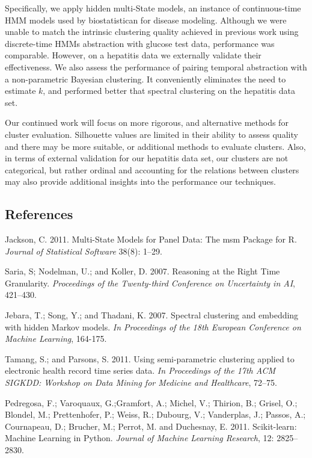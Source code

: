 \documentclass[letterpaper]{article}
\begin{document}
Specifically, we apply hidden multi-State models, an instance of continuous-time HMM models used by biostatistican for disease modeling.  Although we were unable to match the intrinsic clustering quality achieved in previous work using discrete-time HMMs abstraction with glucose test data, performance was comparable.  However, on a hepatitis data we externally validate their effectiveness.  We also assess the performance of pairing temporal abstraction with a non-parametric Bayesian clustering.  It conveniently eliminates the need to estimate $k$, and  performed better that spectral clustering on the hepatitis data set.

 Our continued work will focus on more rigorous, and alternative methods for cluster evaluation. Silhouette values are limited in their ability to assess quality and there may be more suitable, or additional methods to evaluate clusters.  Also, in terms of external validation for our hepatitis data set, our clusters are not categorical, but rather ordinal and accounting for the relations between clusters may also provide additional insights into the performance our techniques.

\subsection{References}

\smallskip \noindent Jackson, C. 2011. Multi-State Models for Panel Data: The msm Package for R. \textit{Journal of Statistical Software} 38(8): 1--29.

\smallskip \noindent Saria, S; Nodelman, U.; and Koller, D. 2007. Reasoning at the Right Time Granularity. \textit{Proceedings of the Twenty-third Conference on Uncertainty in AI}, 421--430.
	
\smallskip \noindent Jebara, T.; Song, Y.; and Thadani, K. 2007. Spectral clustering and embedding with hidden Markov models. \textit{In Proceedings of the 18th European Conference on Machine Learning}, 164-175.

\smallskip \noindent Tamang, S.; and Parsons, S. 2011. Using semi-parametric clustering applied to electronic health record time series data. \textit{In Proceedings of the 17th ACM SIGKDD: Workshop on Data Mining for Medicine and Healthcare}, 72--75.

\smallskip \noindent Pedregosa, F.; Varoquaux, G.;Gramfort, A.; Michel, V.; Thirion, B.; Grisel, O.; Blondel, M.; Prettenhofer, P.; Weiss, R.; Dubourg, V.; Vanderplas, J.; Passos, A.; Cournapeau, D.; Brucher, M.; Perrot, M. and Duchesnay, E. 2011. Scikit-learn: Machine Learning in Python. \textit{Journal of Machine Learning Research}, 12: 2825--2830.
\end{document}
